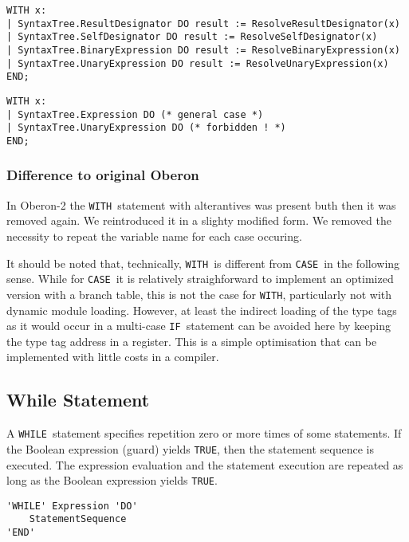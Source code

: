 \documentclass[a4wide,11pt]{article}
\newcommand{\IF}{\lstinline"IF"}
\newcommand{\CASE}{\lstinline"CASE"}
\newcommand{\WHILE}{\lstinline"WHILE"}
\newcommand{\WITH}{\lstinline"WITH"}
\newcommand{\TRUE}{\lstinline"TRUE"}
\begin{document}
\begin{annotation}
\begin{lstlisting}[style=example, caption=Example of a WITH statement]
WITH x:
| SyntaxTree.ResultDesignator DO result := ResolveResultDesignator(x)
| SyntaxTree.SelfDesignator DO result := ResolveSelfDesignator(x)
| SyntaxTree.BinaryExpression DO result := ResolveBinaryExpression(x)
| SyntaxTree.UnaryExpression DO result := ResolveUnaryExpression(x)
END;
\end{lstlisting}

\begin{lstlisting}[style=example, caption= Example of a rejected WITH statement when UnaryExpression inherits from Expression]
WITH x:
| SyntaxTree.Expression DO (* general case *)
| SyntaxTree.UnaryExpression DO (* forbidden ! *)
END;
\end{lstlisting}

\subsubsection{Difference to original Oberon}
In Oberon-2 the \WITH\ statement with alterantives was present buth then it was removed again.
We reintroduced it in a slighty modified form.
We removed the necessity to repeat the variable name for each case occuring.

It should be noted that, technically, \WITH\ is different from \CASE\ in the following sense.
While for \CASE\ it is relatively straighforward to implement an optimized version with a branch table, this is not the case for \WITH, particularly not with dynamic module loading.
However, at least the indirect loading of the type tags as it would occur in a multi-case \IF\ statement can be avoided here by keeping the type tag address in a register.
This is a simple optimisation that can be implemented with little costs in a compiler.
\end{annotation}

\subsection{While Statement}

A \WHILE\ statement specifies repetition zero or more times of some statements.
If the Boolean expression (guard) yields \TRUE, then the statement sequence is executed.
The expression evaluation and the statement execution are repeated as long as the Boolean expression yields \TRUE.

\begin{lstlisting}[style=ebnf]
'WHILE' Expression 'DO'
    StatementSequence
'END'
\end{lstlisting}
\end{document}
